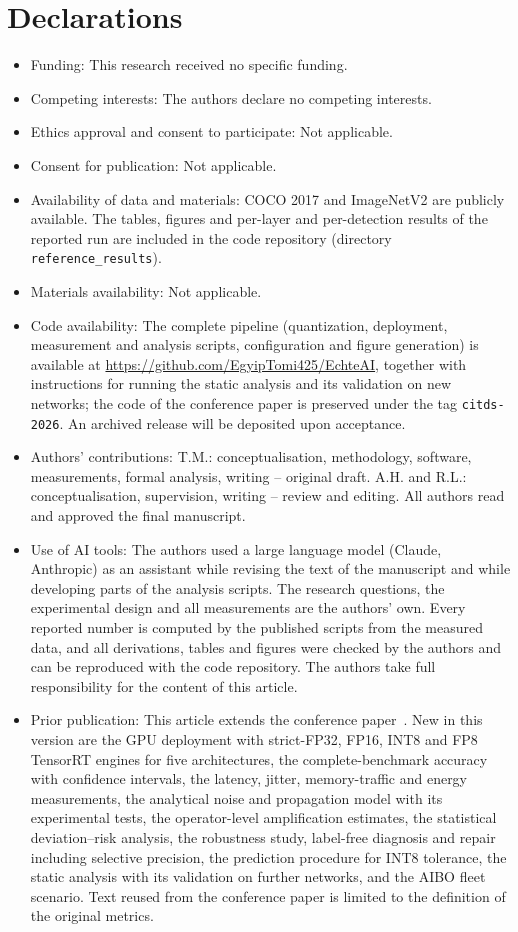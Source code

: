 \documentclass[pdflatex,sn-mathphys-num]{sn-jnl}%
\theoremstyle{thmstyleone}%
\theoremstyle{thmstyletwo}%
\theoremstyle{thmstylethree}%
\begin{document}
\section*{Declarations}
\begin{itemize}
\item Funding: This research received no specific funding.
\item Competing interests: The authors declare no competing interests.
\item Ethics approval and consent to participate: Not applicable.
\item Consent for publication: Not applicable.
\item Availability of data and materials: COCO 2017 and ImageNetV2 are publicly available. The tables, figures and per-layer and per-detection results of the reported run are included in the code repository (directory \texttt{reference\_results}).
\item Materials availability: Not applicable.
\item Code availability: The complete pipeline (quantization, deployment, measurement and analysis scripts, configuration and figure generation) is available at \url{https://github.com/EgyipTomi425/EchteAI}, together with instructions for running the static analysis and its validation on new networks; the code of the conference paper is preserved under the tag \texttt{citds-2026}. An archived release will be deposited upon acceptance.
\item Authors' contributions: T.M.: conceptualisation, methodology, software, measurements, formal analysis, writing -- original draft. A.H. and R.L.: conceptualisation, supervision, writing -- review and editing. All authors read and approved the final manuscript.
\item Use of AI tools: The authors used a large language model (Claude, Anthropic) as an assistant while revising the text of the manuscript and while developing parts of the analysis scripts. The research questions, the experimental design and all measurements are the authors' own. Every reported number is computed by the published scripts from the measured data, and all derivations, tables and figures were checked by the authors and can be reproduced with the code repository. The authors take full responsibility for the content of this article.
\item Prior publication: This article extends the conference paper~\cite{menyhart2026citds}. New in this version are the GPU deployment with strict-FP32, FP16, INT8 and FP8 TensorRT engines for five architectures, the complete-benchmark accuracy with confidence intervals, the latency, jitter, memory-traffic and energy measurements, the analytical noise and propagation model with its experimental tests, the operator-level amplification estimates, the statistical deviation--risk analysis, the robustness study, label-free diagnosis and repair including selective precision, the prediction procedure for INT8 tolerance, the static analysis with its validation on further networks, and the AIBO fleet scenario. Text reused from the conference paper is limited to the definition of the original metrics.
\end{itemize}
\end{document}
